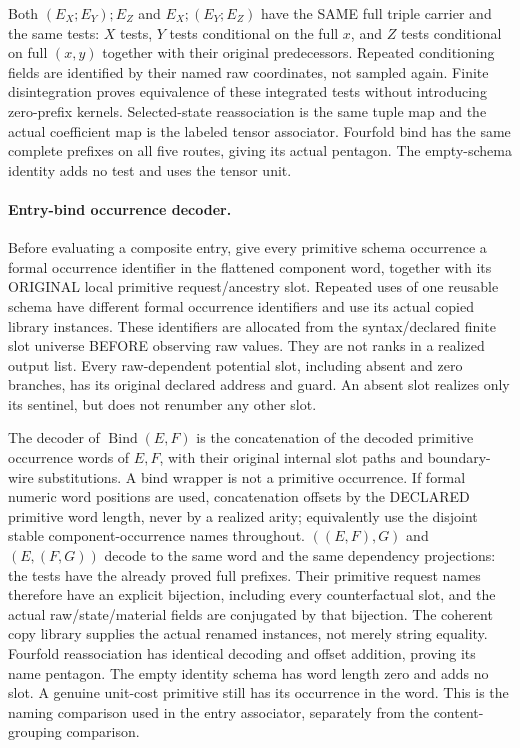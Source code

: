 \documentclass[11pt]{article}
\begin{document}
Both $(E_X;E_Y);E_Z$ and $E_X;(E_Y;E_Z)$ have the SAME full triple carrier and the same tests: $X$ tests, $Y$ tests conditional on the full $x$, and $Z$ tests conditional on full $(x,y)$ together with their original predecessors. Repeated conditioning fields are identified by their named raw coordinates, not sampled again. Finite disintegration proves equivalence of these integrated tests without introducing zero-prefix kernels. Selected-state reassociation is the same tuple map and the actual coefficient map is the labeled tensor associator. Fourfold bind has the same complete prefixes on all five routes, giving its actual pentagon. The empty-schema identity adds no test and uses the tensor unit.

\paragraph{Entry-bind occurrence decoder.}
Before evaluating a composite entry, give every primitive schema occurrence a formal occurrence identifier in the flattened component word, together with its ORIGINAL local primitive request/ancestry slot. Repeated uses of one reusable schema have different formal occurrence identifiers and use its actual copied library instances. These identifiers are allocated from the syntax/declared finite slot universe BEFORE observing raw values. They are not ranks in a realized output list. Every raw-dependent potential slot, including absent and zero branches, has its original declared address and guard. An absent slot realizes only its sentinel, but does not renumber any other slot.

The decoder of $\operatorname{Bind}(E,F)$ is the concatenation of the decoded primitive occurrence words of $E,F$, with their original internal slot paths and boundary-wire substitutions. A bind wrapper is not a primitive occurrence. If formal numeric word positions are used, concatenation offsets by the DECLARED primitive word length, never by a realized arity; equivalently use the disjoint stable component-occurrence names throughout. $((E,F),G)$ and $(E,(F,G))$ decode to the same word and the same dependency projections: the tests have the already proved full prefixes. Their primitive request names therefore have an explicit bijection, including every counterfactual slot, and the actual raw/state/material fields are conjugated by that bijection. The coherent copy library supplies the actual renamed instances, not merely string equality. Fourfold reassociation has identical decoding and offset addition, proving its name pentagon. The empty identity schema has word length zero and adds no slot. A genuine unit-cost primitive still has its occurrence in the word. This is the naming comparison used in the entry associator, separately from the content-grouping comparison.
\end{document}
